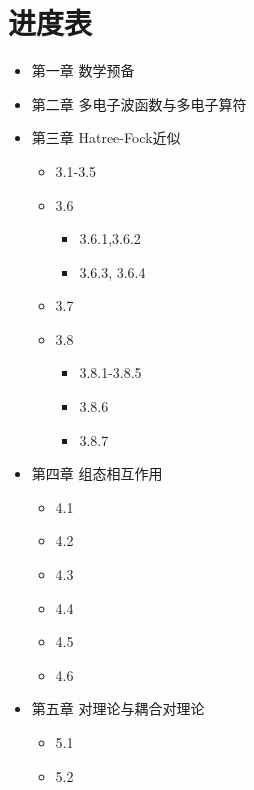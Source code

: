 \chapter*{进度表}

\makeatletter
\@date
\makeatother

\begin{itemize}
    \item[\CheckedBox] 第一章  数学预备
    \item[\CheckedBox] 第二章  多电子波函数与多电子算符
    \item[\DSquare] 第三章  Hatree-Fock近似 
    	\begin{itemize}
		    \item[\CheckedBox] 3.1-3.5
		    \item[\DSquare] 3.6 
		    	\begin{itemize}
		            \item[\CheckedBox] 3.6.1,3.6.2
		            \item[\Square] 3.6.3, 3.6.4
		        \end{itemize}
		    \item[\Square] 3.7
		    \item[\DSquare] 3.8 
			   \begin{itemize}
				     \item[\CheckedBox] 3.8.1-3.8.5
				     \item[\Square] 3.8.6
				     \item[\DSquare] 3.8.7
			   \end{itemize}
    	\end{itemize}
    \item[\DSquare] 
    	第四章 组态相互作用 
	    \begin{itemize}
	        \item[\DSquare] 4.1
	        \item[\CheckedBox] 4.2
			\item[\Square] 4.3
	        \item[\CheckedBox] 4.4
	        \item[\DSquare] 4.5
		\item[\Square] 4.6
	    \end{itemize}
    \item[\DSquare] 第五章 对理论与耦合对理论 
	    \begin{itemize}
	        \item[\DSquare] 5.1
	        \item[\DSquare] 5.2
	        \begin{itemize}

\end{itemize}
\end{itemize}
\end{itemize}
